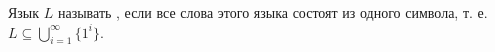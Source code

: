 Язык $L$ называть , если все слова этого языка состоят из одного символа, т. е.
$L \subseteq \bigcup\limits_{i = 1}^{\infty} \{1^{i}\}$.